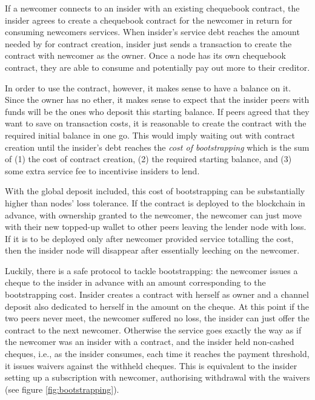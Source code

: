 If a newcomer connects to  an insider with an existing chequebook contract,
the insider agrees to create a chequebook contract for the newcomer
in return for consuming newcomers services.
 When insider's service debt reaches the amount needed by for contract creation,
 insider just sends a transaction to create the contract with newcomer as the owner.
Once a node has its own chequebook contract, they are able
to consume and potentially pay out more to their creditor.

In order to use the contract, however, it makes sense to have a balance on it.
Since the owner has no ether, it makes sense
to expect that the insider peers with funds will be the ones who deposit this starting balance.
If peers agreed that they want to save on transaction costs, it is reasonable to create
the contract with the required initial balance in one go. This would imply waiting out
with contract creation until the insider's debt reaches the \emph{cost of bootstrapping} which is
the sum of (1) the cost of contract creation, (2) the required starting balance, and (3) some
extra service fee to incentivise insiders to lend.

With the global deposit included, this cost of bootstrapping
can be substantially higher than nodes' loss tolerance.
If the contract is deployed to the blockchain in advance, with ownership granted
to the newcomer, the newcomer can just move with their new topped-up wallet
to other peers leaving the lender node with loss.
If it is to be deployed only after newcomer provided service totalling
the cost, then the insider node will disappear after essentially leeching on
the newcomer.

Luckily, there is a safe protocol to tackle
bootstrapping: the newcomer issues a cheque to the insider in advance with an amount
corresponding to the bootstrapping cost. Insider creates a contract with herself as owner
and a channel deposit also dedicated to herself in the amount
on the cheque. At this point if the two peers never meet, the newcomer suffered no loss,
the insider can just offer the contract to the next newcomer. Otherwise the service goes
exactly the way as if the newcomer was an insider with a contract, and the insider held
non-cashed cheques, i.e., as the insider consumes, each time it reaches the
payment threshold, it issues waivers against the withheld cheques. This is equivalent
to the insider setting up a subscription with newcomer, authorising withdrawal
with the waivers (see figure \ref{fig:bootstrapping}).

